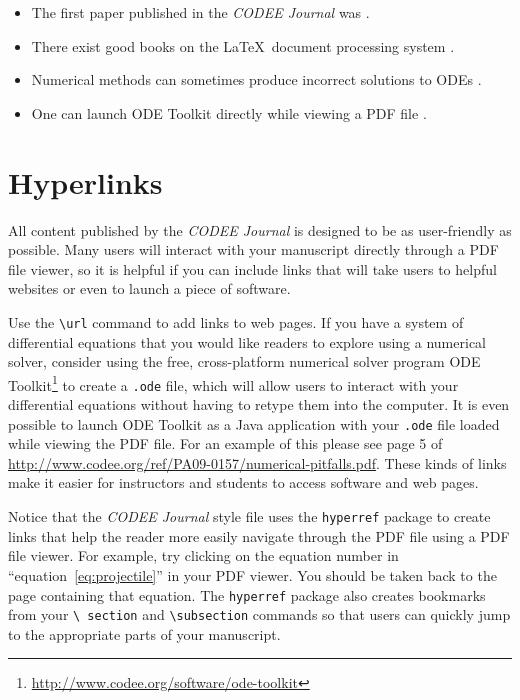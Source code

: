 \documentclass{codee}
\theoremstyle{definition}
\theoremstyle{remark}
\numberwithin{equation}{section}
\begin{document}
\begin{itemize}
\item The first paper published in the \textit{CODEE Journal} was \citet{borrelli-coleman-2009}.
\item There exist good books on the \LaTeX\ document processing system \citep{gratzer-2004,lamport-1994}.
\item Numerical methods can sometimes produce incorrect solutions to ODEs \citep{borrelli-coleman-2009}.
\item One can launch ODE Toolkit directly while viewing a PDF file \citep[see][page 5]{borrelli-coleman-2009}.
\end{itemize}

\section{Hyperlinks}

All content published by the \textit{CODEE Journal} is designed to be
as user-friendly as possible. Many users will interact with your
manuscript directly through a PDF file viewer, so it is helpful if you
can include links that will take users to helpful websites or even to
launch a piece of software.

Use the \texttt{\textbackslash url} command to add links to web
pages. If you have a system of differential equations that you would
like readers to explore using a numerical solver, consider using the
free, cross-platform numerical solver program ODE
Toolkit\footnote{\url{http://www.codee.org/software/ode-toolkit}} to
create a \texttt{.ode} file, which will allow users to interact with
your differential equations without having to retype them into the
computer. It is even possible to launch ODE Toolkit as a Java
application with your \texttt{.ode} file loaded while viewing the PDF
file.  For an example of this please see page 5 of
\url{http://www.codee.org/ref/PA09-0157/numerical-pitfalls.pdf}. These
kinds of links make it easier for instructors and students to access
software and web pages.

Notice that the \textit{CODEE Journal} style file uses the
\texttt{hyperref} package to create links that help the reader more
easily navigate through the PDF file using a PDF file viewer.  For
example, try clicking on the equation number in
``equation~\eqref{eq:projectile}'' in your PDF viewer. You should be
taken back to the page containing that equation. The \texttt{hyperref}
package also creates bookmarks from your \texttt{\textbackslash
  section} and \texttt{\textbackslash subsection} commands so that
users can quickly jump to the appropriate parts of your manuscript.
\end{document}
